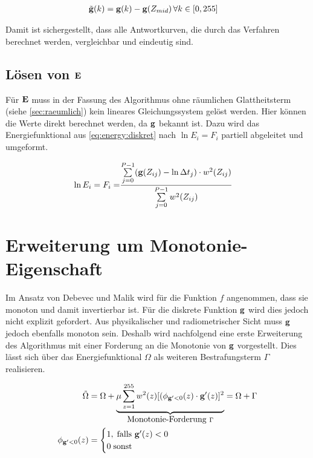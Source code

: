 \begin{align}
\tilde{\mathbf g}(k) &= \mathbf g(k)-\mathbf g(Z_{mid})\, \forall k \in [0,255]
\end{align}

Damit ist sichergestellt, dass alle Antwortkurven, die durch das Verfahren berechnet werden, vergleichbar und eindeutig sind.



\subsection{Lösen von $\mathbf E$}
Für $\mathbf E$ muss in der Fassung des Algorithmus ohne räumlichen Glattheitsterm (siehe \autoref{sec:raeumlich}) kein lineares Gleichungssystem  gelöst werden. Hier können die Werte direkt berechnet werden, da $\mathbf g$ bekannt ist. Dazu wird das Energiefunktional aus \autoref{eq:energy:diskret} nach $\ln E_i = F_i$ partiell abgeleitet und umgeformt.    

\begin{align}
\label{eq:fi:basic}
    \ln E_i = F_i =& \frac{\sum \limits_{j=0}^{P-1} (\mathbf g(Z_{ij})-\ln \Delta t_j)\cdot w^2(Z_{ij})}{\sum \limits_{j=0}^{P-1} w^2(Z_{ij})}
\end{align}



\section{Erweiterung um Monotonie-Eigenschaft}
\label{sec:monotonie}

Im Ansatz von Debevec und Malik wird für die Funktion $f$ angenommen, dass sie monoton und damit invertierbar ist. Für die diskrete Funktion $\mathbf g$ wird dies jedoch nicht explizit gefordert. Aus physikalischer und radiometrischer Sicht muss $\mathbf g$ jedoch ebenfalls monoton sein. Deshalb wird nachfolgend eine erste Erweiterung des Algorithmus mit einer Forderung an die Monotonie von $\mathbf g$ vorgestellt. Dies lässt sich über das Energiefunktional $\Omega$ als weiteren Bestrafungsterm $\Gamma$ realisieren.

\begin{align}
\tilde{\Omega} &= \Omega + \underbrace{\mu \sum \limits_{z=1}^{255} w^2(z) [(\phi_{\mathbf g'<0}(z)\cdot \mathbf g'(z)]^2}_{\mbox{Monotonie-Forderung } \Gamma} = \Omega + \Gamma\\
\phi_{\mathbf g'<0}(z) &= 
    \begin{cases} 
        1, \; \mbox{falls } \mathbf g'(z) < 0\\ 
        0 \; \mbox{sonst}
    \end{cases}
\end{align}

